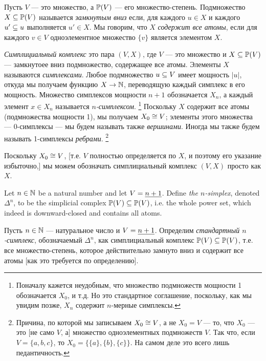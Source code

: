 \documentclass[CT4S-EN-RU]{subfiles}
\begin{document}
\begin{definitionRUS}\label{def:simplicial complex}
Пусть $V$ — это множество, а $\PP(V)$ — его множество-степень. Подмножество $X\ss\PP(V)$ называется {\em замкнутым вниз} если, для каждого $u\in X$ и каждого $u'\ss u$ выполняется $u'\in X$. Мы говорим, что $X$ {\em содержит все атомы}, если для каждого $v\in V$ одноэлементное множество $\{v\}$ является элементом $X$. 

{\em Симплициальный комплекс} это пара $(V,X)$, где $V$ — это множество и $X\ss\PP(V)$ — замкнутоее вниз подмножество, содержащее все атомы. Элементы $X$ называются {\em симплексами}. Любое подмножество $u\ss V$ имеет мощность $|u|$, откуда мы получаем функцию $X\to\NN$, переводящую каждый симплекс в его мощность. Множество симплексов мощности $n+1$ обозначается $X_n$, а каждый элемент $x\in X_n$ называется {\em $n$-симплексом}.%
\footnote{Поначалу кажется неудобным, что множество подмножеств мощности 1 обозначается $X_0$, и т.д. Но это стандартное соглашение, поскольку, как мы увидим позже, $X_n$ содержит $n$-мерные симплексы.}
Поскольку $X$ содержит все атомы (подмножества мощности 1), мы получаем $X_0\iso V$; элементы этого множества — 0-симплексы — мы будем называть также {\em вершинами}. Иногда мы также будем называть 1-симплексы {\em ребрами}.%
\footnote{Причина, по которой мы записываем $X_0\iso V$, а не $X_0=V$ — то, что $X_0$ — это [не само $V$, а] множество одноэлементных подмножеств $V$. Так что, если $V=\{a,b,c\}$, то $X_0=\{\{a\},\{b\},\{c\}\}$. На самом деле это всего лишь педантичность.}

Поскольку $X_0\iso V$, [т.е. $V$ полностью определяется по $X$, и поэтому его указание избыточно,] мы можем обозначать симплициальный комплекс $(V,X)$ просто как $X$.
\end{definitionRUS}

\begin{exampleENG}
Let $n\in\NN$ be a natural number and let $V=\ul{n+1}$. Define {\em the $n$-simplex}, denoted $\Delta^n$, to be the simplicial complex $\PP(V)\ss\PP(V)$, i.e. the whole power set, which indeed is downward-closed and contains all atoms. 
\end{exampleENG}

\begin{exampleRUS}
Пусть $n\in\NN$ — натуральное число и $V=\ul{n+1}$. Определим {\em стандартный $n$-симплекс},%
обозначаемый $\Delta^n$, как симплициальный комплекс $\PP(V)\ss\PP(V)$, т.е. все множество-степень, которое действительно замнуто вниз и содержит все атомы [как это требуется по определению]. 
\end{exampleRUS}
\end{document}

